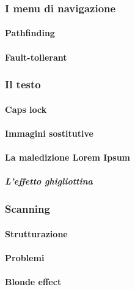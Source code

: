 		\subsubsection{I menu di navigazione}
			\paragraph{Pathfinding}
			\paragraph{Fault-tollerant}
			
		\subsubsection{Il testo}
			
			\paragraph{Caps lock}
			\paragraph{Immagini sostitutive}
			\paragraph{La maledizione Lorem Ipsum}
				\subparagraph{L'effetto ghigliottina}
				
		\subsubsection{Scanning}
			\paragraph{Strutturazione}
			\paragraph{Problemi}
			\paragraph{Blonde effect}		